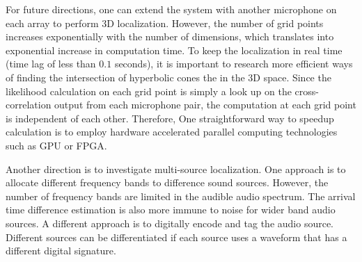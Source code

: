 For future directions, one can extend the system with another microphone on each array to perform 3D localization. However, the number of grid points increases exponentially with the number of dimensions, which translates into exponential increase in computation time. To keep the localization in real time (time lag of less than $0.1$ seconds), it is important to research more efficient ways of finding the intersection of hyperbolic cones the in the 3D space. Since the likelihood calculation on each grid point is simply a look up on the cross-correlation output from each microphone pair, the computation at each grid point is independent of each other. Therefore, One straightforward way to speedup calculation is to employ hardware accelerated parallel computing technologies such as GPU or FPGA. 

Another direction is to investigate multi-source localization. One approach is to allocate different frequency bands to difference sound sources. However, the number of frequency bands are limited in the audible audio spectrum. The arrival time difference estimation is also more immune to noise for wider band audio sources. A different approach is to digitally encode and tag the audio source. Different sources can be differentiated if each source uses a waveform that has a different digital signature.
